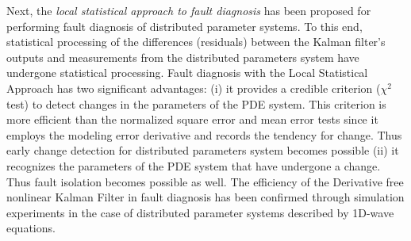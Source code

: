 \documentclass[journal]{IEEEtran}
\begin{document}
\noindent Next, the \textit{local statistical approach to fault diagnosis} has been proposed for performing fault diagnosis of distributed parameter systems. To this end, statistical processing of the differences (residuals) between the Kalman filter's outputs and measurements from the distributed parameters system have undergone statistical processing. Fault diagnosis with the Local Statistical Approach has two significant advantages: (i) it provides a credible criterion ($\chi^2$ test) to detect changes in the parameters of the PDE system. This criterion is more efficient than the normalized square error and mean error tests since it employs the modeling error derivative and records the tendency for change. Thus early change detection for distributed parameters system becomes possible (ii) it recognizes the parameters of the PDE system that have undergone a change. Thus fault isolation becomes possible as well. The efficiency of the Derivative free nonlinear Kalman Filter in fault diagnosis  has been confirmed through simulation experiments in the case of distributed parameter systems described by 1D-wave equations.
\end{document}

